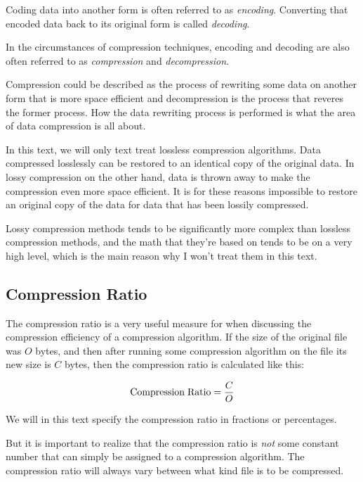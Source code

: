 Coding data into another form is often referred to as
\textit{encoding}. Converting that encoded data back
to its original form is called \textit{decoding}.

In the circumstances of compression techniques, encoding and decoding
are also often referred to as \textit{compression}
and \textit{decompression}.

Compression could be described as the process of rewriting some data
on another form that is more space efficient and decompression is the
process that reveres the former process. How the data rewriting
process is performed is what the area of data compression is all
about.

In this text, we will only text treat lossless compression
algorithms. Data compressed losslessly can be restored to an identical
copy of the original data. In lossy compression on the other hand,
data is thrown away to make the compression even more space
efficient. It is for these reasons impossible to restore an original
copy of the data for data that has been lossily compressed.

Lossy compression methods tends to be significantly more complex than
lossless compression methods, and the math that they're based on tends
to be on a very high level, which is the main reason why I won't treat
them in this text.

\subsection{Compression Ratio}

The compression ratio is a very useful
measure for when discussing the compression efficiency of a
compression algorithm. If the size of the original file was $O$ bytes,
and then after running some compression algorithm on the file its new
size is $C$ bytes, then the compression ratio is calculated like this:

\begin{equation}
  \label{eq:compress-ratio}
  {\rm Compression\;Ratio} = \frac{C}{O}
\end{equation}

We will in this text specify the compression ratio in fractions or
percentages.

But it is important to realize that the compression ratio is
\textit{not} some constant number that can simply be assigned to a
compression algorithm. The compression ratio will always vary between
what kind file is to be compressed.

